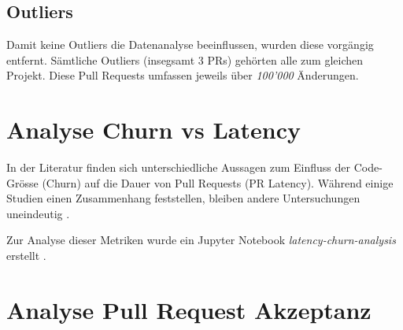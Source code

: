 \subsection{Outliers}
Damit keine Outliers die Datenanalyse beeinflussen, wurden diese vorgängig entfernt. Sämtliche Outliers (insegsamt 3 PRs) gehörten alle zum gleichen Projekt. Diese Pull Requests umfassen jeweils über \textit{100'000} Änderungen.

\section{Analyse Churn vs Latency}
In der Literatur finden sich unterschiedliche Aussagen zum Einfluss der Code-Grösse (Churn) auf die Dauer von Pull Requests (PR Latency). Während einige Studien einen Zusammenhang feststellen, bleiben andere Untersuchungen uneindeutig \parencite{hasan_understanding_2023}\parencite{kudrjavets_small_2022}.

Zur Analyse dieser Metriken wurde ein Jupyter Notebook \textit{latency-churn-analysis} erstellt \parencite{stumpf_simon_repo-detectivesba-metric-analysis-scripts_nodate}. 


\section{Analyse Pull Request Akzeptanz}